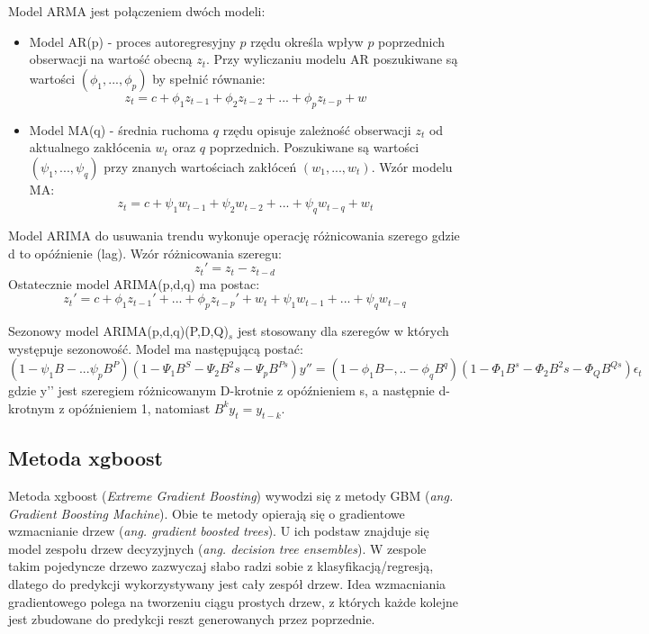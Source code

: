\documentclass[11pt]{report}
\begin{document}
Model ARMA jest połączeniem dwóch modeli:
\begin{itemize}
\item Model AR(p) - proces autoregresyjny $p$ rzędu określa wpływ $p$ poprzednich obserwacji na wartość obecną $z_t$.
Przy wyliczaniu modelu AR poszukiwane są wartości $(\phi_1, ..., \phi_p)$ by spełnić równanie\cite{armia_s_zajac}:
\begin{equation}
    z_t = c + \phi_1 z_{t-1} + \phi_2 z_{t-2} + ... + \phi_p z_{t-p}+w
\end{equation}


\item Model MA(q) - średnia ruchoma $q$ rzędu opisuje zależność obserwacji $z_t$ od aktualnego zakłócenia $w_t$ oraz $q$ poprzednich.  Poszukiwane są wartości $(\psi_1, ..., \psi_q)$ przy znanych wartościach zakłóceń $(w_1, ..., w_t)$. Wzór modelu MA\cite{armia_s_zajac}: 
\begin{equation}
    z_t = c + \psi_1 w_{t-1} + \psi_2 w_{t-2} + ... + \psi_q w_{t-q} + w_t
\end{equation}
\end{itemize}

Model ARIMA do usuwania trendu wykonuje operację różnicowania szerego gdzie d to opóźnienie (lag). Wzór różnicowania szeregu\cite{armia_s_zajac}:
\begin{equation}
    z_{t}'=z_t-z_{t-d}
\end{equation}
Ostatecznie model ARIMA(p,d,q) ma postac\cite{armia_s_zajac}:
\begin{equation}
    z_t' = c + \phi_1 z_{t-1}' + ... + \phi_p z_{t-p}' + w_t + \psi_1 w_{t-1} + ... + \psi_q w_{t-q}
\end{equation}

Sezonowy model ARIMA(p,d,q)(P,D,Q)$_s$ jest stosowany dla szeregów w których występuje sezonowość. Model ma następującą postać:
\begin{equation}
( 1-\psi_1 B - ... \psi_p B^P )(1-\Psi_1B^S-\Psi_2 B^2s - \Psi_p B^{Ps})y'' = (1-\phi_1 B - ,.. - \phi_q B^q)(1-\Phi_1 B^s - \Phi_2 B^2s - \Phi_Q B^{Qs})\epsilon_t
\end{equation}
gdzie y’’ jest szeregiem różnicowanym D-krotnie z opóźnieniem s, a następnie d-krotnym z opóźnieniem 1, natomiast $B^ky_t=y_{t-k}$\cite{analiza_i_prognozy_szeregow_czasowych_quantup}.

\subsection{Metoda xgboost}
Metoda xgboost (\textit{Extreme Gradient Boosting}) wywodzi się z metody GBM (\textit{ang. Gradient Boosting Machine}).
Obie te metody opierają się o gradientowe wzmacnianie drzew (\textit{ang. gradient boosted trees}).
U ich podstaw znajduje się model zespołu drzew decyzyjnych (\textit{ang. decision tree ensembles}).
W zespole takim pojedyncze drzewo zazwyczaj słabo radzi sobie z klasyfikacją/regresją, dlatego do predykcji wykorzystywany jest cały zespół drzew.
Idea wzmacniania gradientowego polega na tworzeniu ciągu prostych drzew, z których każde kolejne jest zbudowane do predykcji reszt generowanych przez poprzednie.
\end{document}
